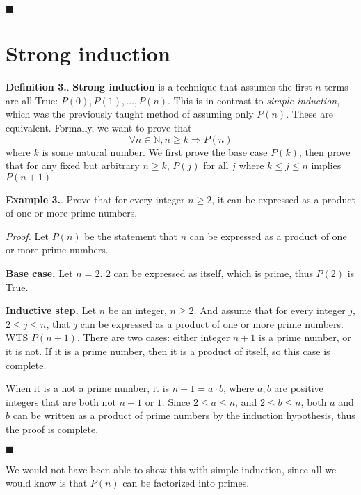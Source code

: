 \documentclass{article}
\newcounter{defcount}
\newcounter{excount}
\newcommand\df{\stepcounter{defcount} \textbf{Definition 3.\thedefcount}. }
\newcommand\ex{\stepcounter{excount} \textbf{Example 3.\theexcount}. }
\newcommand\qedsymbol{\hfill$\blacksquare$}
\begin{document}
\qedsymbol

\newpage
\section{Strong induction}
\df \textbf{Strong induction} is a technique that assumes the first $n$ terms 
are all True: $P(0), P(1), \ldots, P(n)$. This is in contrast to \textit{simple
induction}, which was the previously taught method of assuming only $P(n)$. 
These are equivalent. Formally, we want to prove that $$\forall n \in \mathbb{N}, 
n \geq k \Rightarrow P(n)$$
where $k$ is some natural number. We first prove the base case $P(k)$, then 
prove that for any fixed but arbitrary $n \geq k $, $P(j)$ for all $j$ where 
$k \leq j \leq n$ implies $P(n+1)$

\ex Prove that for every integer $n \geq 2$, it can be expressed as a product 
of one or more prime numbers,

\textit{Proof.} Let $P(n)$ be the statement that $n$ can be expressed as a 
product of one or more prime numbers. 

\textbf{Base case.} Let $n = 2$. 2 can be expressed as itself, which is prime, 
thus $P(2)$ is True.

\textbf{Inductive step.} Let $n$ be an integer, $n \geq 2$. And assume that for 
every integer $j$, $2 \leq j \leq n$, that $j$ can be expressed as a product 
of one or more prime numbers. WTS $P(n+1)$. There are two cases: either 
integer $n + 1$ is a prime number, or it is not. If it is a prime number, then 
it is a product of itself, so this case is complete. 

When it is a not a prime number, it is $n + 1 = a \cdot b$, where $a, b $ are 
positive integers that are both not $n+1$ or $1$. Since $ 2 \leq a \leq n$, 
and $2 \leq b \leq n$, both $a$ and $b$ can be written as a product of prime 
numbers by the induction hypothesis, thus the proof is complete.

\qedsymbol

We would not have been able to show this with simple induction, since all 
we would know is that $P(n)$ can be factorized into primes. 
\end{document}
